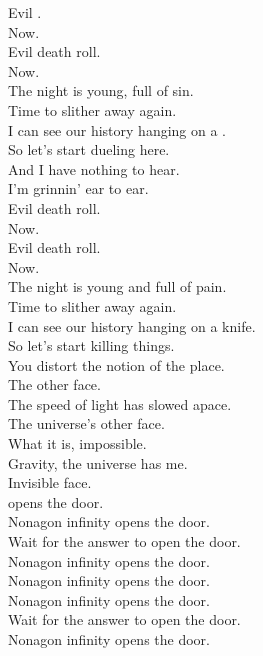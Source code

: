 Evil . \\
Now. \\
Evil death roll. \\
Now. \\

The night is young, full of sin. \\
Time to slither away again. \\
I can see our history hanging on a . \\

So let's start dueling here. \\
And I have nothing to hear. \\
I'm grinnin' ear to ear. \\

Evil death roll. \\
Now. \\
Evil death roll. \\
Now. \\

The night is young and full of pain. \\
Time to slither away again. \\
I can see our history hanging on a knife. \\
So let's start killing things. \\

You distort the notion of the place. \\
The  other face. \\
The speed of light has slowed apace. \\
The universe's other face. \\

What it is, impossible. \\
Gravity, the universe has me. \\
Invisible face. \\

 opens the door. \\
Nonagon infinity opens the door. \\
Wait for the answer to open the door. \\
Nonagon infinity opens the door. \\

Nonagon infinity opens the door. \\
Nonagon infinity opens the door. \\
Wait for the answer to open the door. \\
Nonagon infinity opens the door. \\

